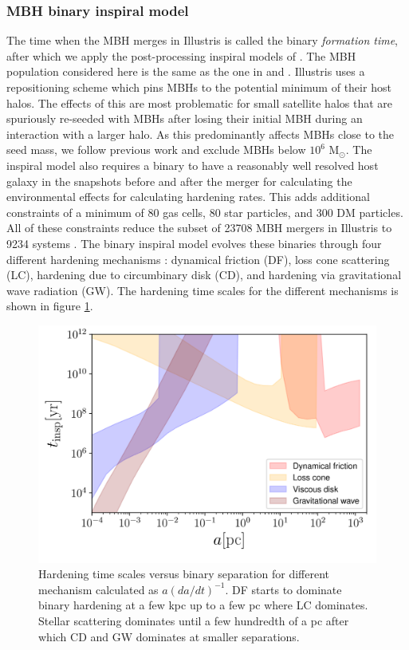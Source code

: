 \documentclass[11pt, letterpaper]{article}
\newcommand{\msun}{M$_{\odot}$}
\begin{document}
\subsubsection{MBH binary inspiral model}
\label{sec: insp-hardening-model}
The time when the MBH merges in Illustris is called the binary \emph{formation time}, after which we apply the post-processing inspiral models of  \citet{Kelley_2017a}. The MBH population considered here is the same as the one in \citet{sayeb_massive_2021} and \cite{sayeb_mbh_2023}. Illustris uses a repositioning scheme which pins MBHs to the potential minimum of their host halos. The effects of this are most problematic for small 
satellite halos that are spuriously re-seeded with MBHs after losing their initial MBH during an interaction with a larger halo. As this predominantly affects MBHs close to the seed mass, we follow previous work and exclude
MBHs below $10^6$ \msun{}.  The inspiral model also requires a binary to have a reasonably well resolved host galaxy in the snapshots before and after the merger for calculating the environmental effects for calculating hardening rates. This adds additional constraints of a minimum of 80 gas cells, 80 star particles, and 300 DM particles. All of these constraints reduce the subset of 23708 MBH mergers in Illustris to 9234 systems \citep{Kelley_2017a,sayeb_massive_2021,sayeb_mbh_2023}. The binary inspiral model evolves these binaries through four different hardening mechanisms \citep{Begelman1980}: dynamical friction (DF), loss cone scattering (LC), hardening due to circumbinary disk (CD), and hardening via gravitational wave radiation (GW). The hardening time scales for the different mechanisms is shown in figure \ref{fig:hardening-time-scales}.


\begin{figure}[!htb]
    \centering
    \includegraphics[width=0.7\linewidth]{fig/hardening_time_scales.png}
    \caption{Hardening time scales versus binary separation for different mechanism calculated as $a (da/dt)^{-1}$. DF starts to dominate binary hardening at a few kpc up to a few pc where LC dominates. Stellar scattering dominates until a few hundredth of a pc after which CD and GW dominates at smaller separations. }
    \label{fig:hardening-time-scales}
\end{figure}
\end{document}
